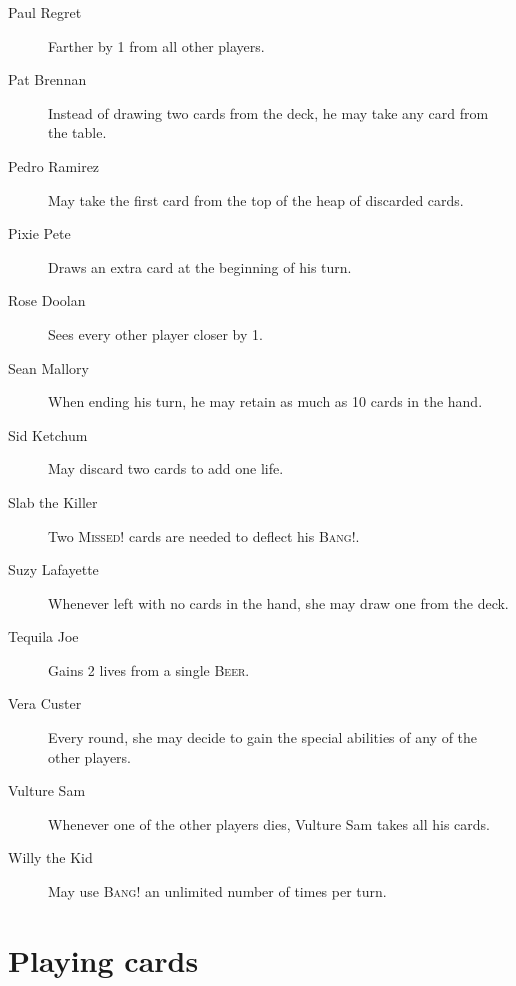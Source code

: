 \documentclass[a4paper,10pt,reqno]{amsart}
\newcommand{\card}[1]{\textsc{#1}}
\begin{document}
\begin{description}
		\item[Paul Regret] Farther by 1 from all other players.
		\item[Pat Brennan] Instead of drawing two cards from the deck, he may take any card from the table.
		\item[Pedro Ramirez] May take the first card from the top of the heap of discarded cards.
		\item[Pixie Pete] Draws an extra card at the beginning of his turn.
		\item[Rose Doolan] Sees every other player closer by 1.
		\item[Sean Mallory] When ending his turn, he may retain as much as 10 cards in the hand.
		\item[Sid Ketchum] May discard two cards to add one life.
		\item[Slab the Killer] Two \card{Missed!} cards are needed to deflect his \card{Bang!}.
		\item[Suzy Lafayette] Whenever left with no cards in the hand, she may draw one from the deck.
		\item[Tequila Joe] Gains 2 lives from a single \card{Beer}.
		\item[Vera Custer] Every round, she may decide to gain the special abilities of any
			of the other players.
		\item[Vulture Sam] Whenever one of the other players dies, Vulture Sam takes all his cards.
		\item[Willy the Kid] May use \card{Bang!} an unlimited number of times per turn.
	\end{description}
	
	\section*{Playing cards}
\end{document}
